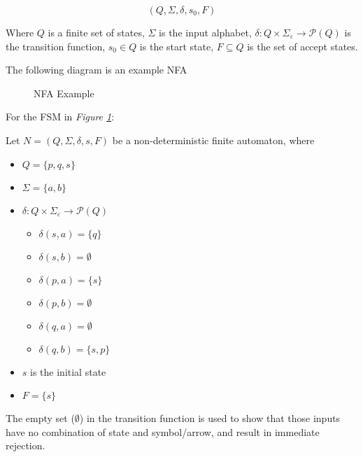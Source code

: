 \documentclass[11pt]{article}
\begin{document}
$$ (Q, \Sigma, \delta, s_0, F) $$

Where $Q$ is a finite set of states, $\Sigma$ is the input alphabet, $\delta : Q
\times \Sigma_\varepsilon \to \mathcal{P}(Q)$ is the transition function, $s_0
\in Q$ is the start state, $F \subseteq Q$ is the set of accept states.

The following diagram is an example NFA

\begin{figure}[H]
	\centering
	\caption{NFA Example}
	\label{fig:nfaexample}
\end{figure}


For the FSM in \emph{Figure \ref{fig:nfaexample}}:

Let $N=(Q,\Sigma,\delta,s,F)$ be a non-deterministic finite automaton, where

\begin{itemize}
	\item $Q = \{p, q, s\}$
	\item $\Sigma = \{a, b\}$
  \item $\delta : Q \times \Sigma_\varepsilon \to \mathcal{P}(Q)$
		\begin{itemize}
			\item $\delta(s,a)=\{q\}$
			\item $\delta(s,b)=\emptyset$
			\item $\delta(p,a)=\{s\}$
			\item $\delta(p,b)=\emptyset$
			\item $\delta(q,a)=\emptyset$
			\item $\delta(q,b)=\{s,p\}$
		\end{itemize}
	\item $s$ is the initial state
	\item $F = \{s\}$
\end{itemize}

The empty set ($\emptyset$) in the transition function is used to show that
those inputs have no combination of state and symbol/arrow, and result in
immediate rejection.
\end{document}
